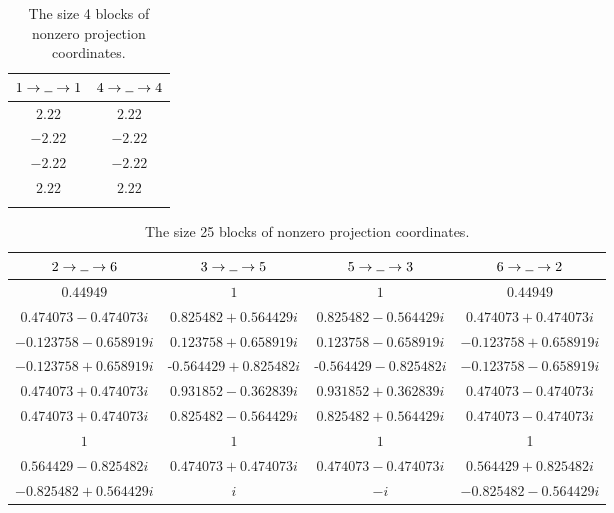 \documentclass[pdflatex,sn-mathphys-num]{sn-jnl}%
\theoremstyle{thmstyleone}%
\theoremstyle{thmstyletwo}%
\theoremstyle{thmstylethree}%
\newcommand{\blank}{\rule{0.2cm}{0.15mm}}
\begin{document}
\begin{table}
    \caption{The size 4 blocks of nonzero projection coordinates.}
    \label{tab:lvl-4-proj-coefs-1}
    \begin{tabular}{c|c} 
        \toprule
        $1\to\blank\to1$ & $4\to\blank\to4$ \\ 
        \midrule
        $2.22$  & $2.22$ \\
        $-2.22$ & $-2.22$ \\
        $-2.22$ & $-2.22$ \\
        $2.22$  & $2.22$ \\
        \botrule
    \end{tabular}
\end{table}


\begin{table}
    \caption{The size 25 blocks of nonzero projection coordinates.}
    \label{tab:lvl-4-proj-coefs-2}
    \begin{tabular}{c|c|c|c}
        \toprule
        $2\to\blank\to6$                 & $3\to\blank\to5$         & $5\to\blank\to3$           & $6\to\blank\to2$ \\ 
        \midrule
        $0.44949$                        & $1$                      & $1$                        & $0.44949$ \\
        $0.474073 - 0.474073 i$          & $0.825482 + 0.564429 i$  & $0.825482 - 0.564429 i$    & $0.474073 + 0.474073 i$ \\
        $-0.123758 - 0.658919 i$         & $0.123758 + 0.658919 i$  & $0.123758 - 0.658919 i$    & $-0.123758 + 0.658919 i$ \\
        $-0.123758 + 0.658919 i$         & -$0.564429 + 0.825482 i$ & -$0.564429 - 0.825482 i$   & $-0.123758 - 0.658919 i$ \\
        $0.474073 + 0.474073 i$          & $0.931852 - 0.362839 i$  & $0.931852 + 0.362839 i$    & $0.474073 - 0.474073 i$ \\
        $0.474073 + 0.474073 i$          & $0.825482 - 0.564429 i$  & $0.825482 + 0.564429 i$    & $0.474073 - 0.474073 i$ \\
        $1$                              & $1$                      & $1$                        & 1 \\
        $0.564429 - 0.825482 i$          & $0.474073 + 0.474073 i$  & $0.474073 - 0.474073 i$    & $0.564429 + 0.825482 i$ \\
        $-0.825482 + 0.564429 i$         & $i$                      & $-i$                       & $-0.825482 - 0.564429 i$ \\ 

\end{tabular}
\end{table}
\end{document}
